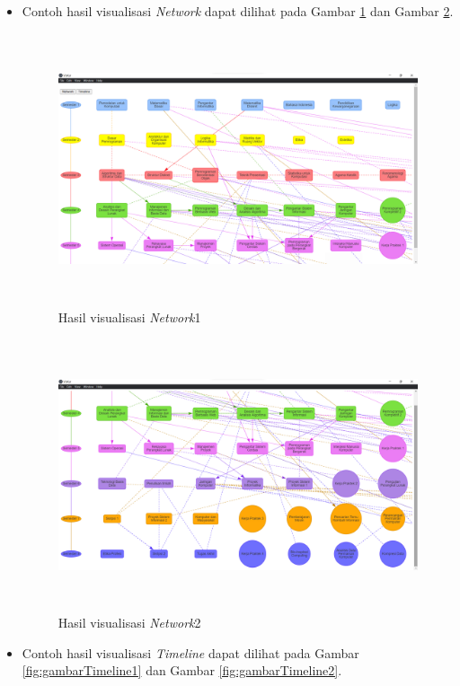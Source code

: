\begin{itemize}
    \item Contoh hasil visualisasi \textit{Network} dapat dilihat pada Gambar \ref{fig:gambarNetwork1} dan Gambar \ref{fig:gambarNetwork2}.
    
    \begin{figure}[H]
        \centering
        \includegraphics[width=12cm, height=8cm]{Gambar/Network1.png}
        \caption{Hasil visualisasi \textit{Network}1}
        \label{fig:gambarNetwork1}
    \end{figure}
    
    \begin{figure}[H]
        \centering
        \includegraphics[width=12cm, height=8cm]{Gambar/Network2.png}
        \caption{Hasil visualisasi \textit{Network}2}
        \label{fig:gambarNetwork2}
    \end{figure}
    
    \item Contoh hasil visualisasi \textit{Timeline} dapat dilihat pada Gambar \ref{fig:gambarTimeline1} dan Gambar \ref{fig:gambarTimeline2}.
    

\end{itemize}
